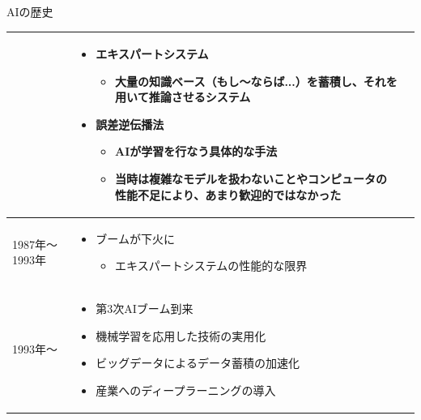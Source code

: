 \documentclass[dvipdfmx,aspectratio=169]{beamer}
\begin{document}
\begin{frame}[shrink]{AIの歴史}
\begin{table}[h]
\begin{tabular}{lp{35em}p{40em}}
\begin{minipage}{35em}
\begin{itemize}
												\end{itemize}
											\end{minipage}  
										& \begin{minipage}{40em}
											\begin{itemize}
												\item \alert{エキスパートシステム}
												\begin{itemize}
													\item 大量の知識ベース（もし～ならば...）を蓄積し、それを用いて推論させるシステム
												\end{itemize}
												\item \alert{誤差逆伝播法}
												\begin{itemize}
													\item AIが学習を行なう具体的な手法
													\item 当時は複雑なモデルを扱わないことやコンピュータの性能不足により、あまり歓迎的ではなかった
												\end{itemize}
											\end{itemize}
										\end{minipage}\\
				\midrule
				1987年～1993年            & \begin{minipage}{35em}
												\begin{itemize}
													\item ブームが下火に
													\begin{itemize}
														\item エキスパートシステムの性能的な限界
													\end{itemize}
												\end{itemize}
											\end{minipage} & \\
				\midrule
				1993年～                 & \begin{minipage}{40em}
												\begin{itemize}
													\item 第3次AIブーム到来
													\item \alert{機械学習}を応用した技術の実用化
													\item \alert{ビッグデータ}によるデータ蓄積の加速化
													\item 産業への\alert{ディープラーニング}の導入
												\end{itemize}
											\end{minipage}                                

\end{tabular}
\end{table}
\end{frame}
\end{document}

